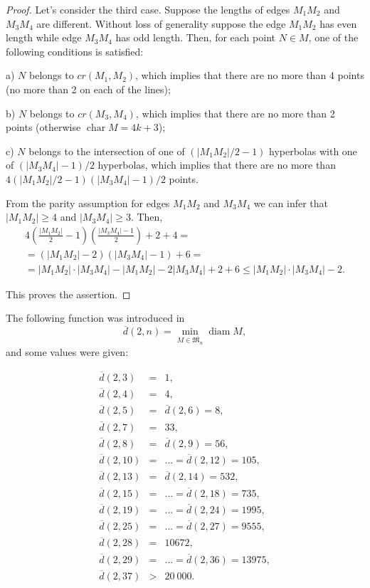 \documentclass[a4paper,14pt]{article} %
\theoremstyle{plain}
\theoremstyle{definition}
\begin{document}
\begin{proof}
	Let's consider the third case. Suppose the lengths of edges $M_1M_2$ and $M_3M_4$ are different. Without loss of generality suppose the edge $M_1M_2$ has even length while edge $M_3 M_4$ has odd length.
	Then, for each point $N\in M$, one of the following conditions is satisfied:

	a) $N$ belongs to $cr(M_1, M_2)$, which implies that there are no more than 4 points (no more than 2 on each of the lines);

	b) $N$ belongs to $cr(M_3,M_4)$, which implies that there are no more than 2 points (otherwise $\operatorname{char} M = 4k+3$);

	c) $N$ belongs to the intersection of one of $(|{M_1 M_2}|/2-1)$ hyperbolas with one of $(|M_3 M_4|-1)/2$ hyperbolas, which implies that there are no more than $4(|M_1 M_2|/2-1)(|M_3 M_4|-1)/2$ points.

	From the parity assumption for edges $M_1 M_2$ and $M_3 M_4$
	we can infer that $|M_1 M_2|\geq4$ and $|M_3M_4|\geq3$.
	Then,
	\begin{multline}
		4\left(\frac{|M_1 M_2|}{2} - 1\right) \left(\frac{|M_3 M_4| - 1}{2}\right) + 2 + 4
		=
		\\=
		(|M_1 M_2| - 2)(|M_3 M_4| - 1) + 6
		=
		\\=
		|M_1 M_2| \cdot |M_3 M_4| - |M_1 M_2| - 2 |M_3 M_4| + 2 + 6
		\leq
		|M_1 M_2| \cdot |M_3 M_4| - 2
		.
	\end{multline}

	This proves the assertion.
\end{proof}


The following function was introduced in~\cite{kurz2008minimum}
\begin{equation}
	\overline{d}(2,n) = \min_{M\in\overline{\mathfrak{M}_{n}}} \operatorname{diam} M
	,
\end{equation}
and some values were given:




\begin{eqnarray}
\label{d}
\overline{d}(2,3)&=& 1,{}\nonumber\\
\overline{d}(2,4)&=& 4,{}\nonumber\\
\overline{d}(2,5)&=&  \overline{d}(2,6)= 8,{}\nonumber\\
\overline{d}(2,7)&=& 33,{}\nonumber\\
\overline{d}(2,8)&=&  \overline{d}(2,9)= 56,{}\nonumber\\
\overline{d}(2,10)&=& ... =\overline{d}(2,12)= 105,{}\nonumber\\
\overline{d}(2,13)&=&  \overline{d}(2,14)= 532,{}\nonumber\\
\overline{d}(2,15)&=&  ... = \overline{d}(2,18) = 735,{}\nonumber\\
\overline{d}(2,19)&=& ... = \overline{d}(2,24) = 1995,{}\nonumber\\
\overline{d}(2,25)&=&  ... = \overline{d}(2,27)= 9555,{}\nonumber\\
\overline{d}(2,28)&=& 10672,{}\nonumber\\
\overline{d}(2,29)&=&  ... = \overline{d}(2,36) = 13975,{}\nonumber\\
\overline{d}(2,37) &>& 20\ 000.
\end{eqnarray}
\end{document}
